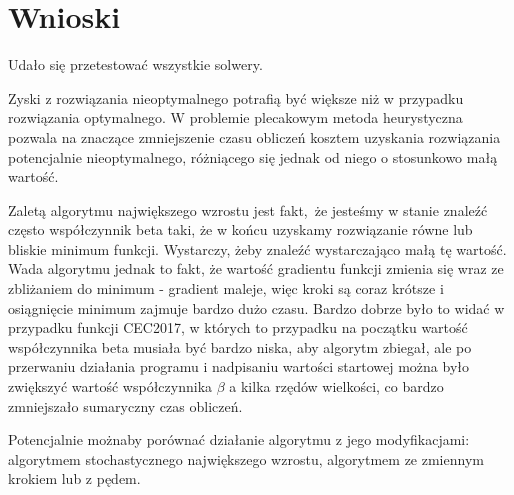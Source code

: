     \section{Wnioski}
	Udało się przetestować wszystkie solwery.
	
	Zyski z rozwiązania nieoptymalnego potrafią być większe niż w przypadku rozwiązania optymalnego. W problemie plecakowym metoda heurystyczna pozwala na znaczące zmniejszenie czasu obliczeń kosztem uzyskania rozwiązania potencjalnie nieoptymalnego, różniącego się jednak od niego o stosunkowo małą wartość. 
	
	Zaletą algorytmu największego wzrostu jest fakt, że jesteśmy w stanie znaleźć często współczynnik beta taki, że w końcu uzyskamy rozwiązanie równe lub bliskie minimum funkcji. Wystarczy, żeby znaleźć wystarczająco małą tę wartość. Wada algorytmu jednak to fakt, że wartość gradientu funkcji zmienia się wraz ze zbliżaniem do minimum - gradient maleje, więc kroki są coraz krótsze i osiągnięcie minimum zajmuje bardzo dużo czasu. Bardzo dobrze było to widać w przypadku funkcji CEC2017, w których to przypadku na początku wartość współczynnika beta musiała być bardzo niska, aby algorytm zbiegał, ale po przerwaniu działania programu i nadpisaniu wartości startowej można było zwiększyć wartość współczynnika $\beta$ a kilka rzędów wielkości, co bardzo zmniejszało sumaryczny czas obliczeń. 
	
	Potencjalnie możnaby porównać działanie algorytmu z jego modyfikacjami: algorytmem stochastycznego największego wzrostu, algorytmem ze zmiennym krokiem lub z pędem.
